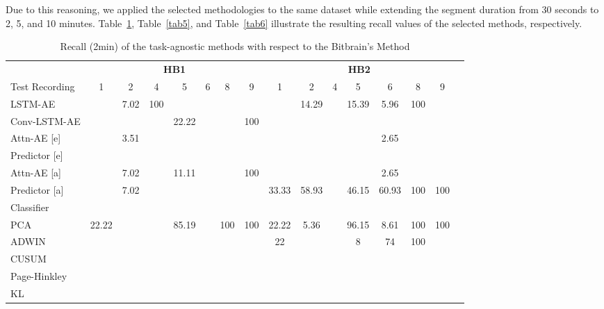 Due to this reasoning, we applied the selected methodologies to the same dataset while extending the segment duration from 30 seconds to 2, 5, and 10 minutes. Table~\ref{tab4}, Table~\ref{tab5}, and Table~\ref{tab6} illustrate the resulting recall values of the selected methods, respectively.

\begin{table}[btp]
\centering
\caption{Recall (2min) of the task-agnostic methods with respect to the Bitbrain's Method}
\label{tab4}

\begin{tabular}{lccccccccccccccc}
\toprule
          & \multicolumn{7}{c}{\textbf{HB1}} & \multicolumn{7}{c}{\textbf{HB2}} \\
\cmidrule(lr){2-8}\cmidrule(lr){9-15}
Test Recording & 1 & 2 & 4 & 5 & 6 & 8 & 9 & 1 & 2 & 4 & 5 & 6 & 8 & 9 \\
\cmidrule(lr){2-8}\cmidrule(lr){9-15}
LSTM-AE	&		&	7.02	&	100	&		&		&		&		&		&	14.29	&		&	15.39	&	5.96	&	100	&		\\
Conv-LSTM-AE	&		&		&		&	22.22	&		&		&	100	&		&		&		&		&		&		&		\\
\midrule
Attn-AE [e]	&		&	3.51	&		&		&		&		&		&		&		&		&		&	2.65	&		&		\\
Predictor [e]	&		&		&		&		&		&		&		&		&		&		&		&		&		&		\\
\midrule
Attn-AE [a]	&		&	7.02	&		&	11.11	&		&		&	100	&		&		&		&		&	2.65	&		&		\\
Predictor [a]	&		&	7.02	&		&		&		&		&		&	33.33	&	58.93	&		&	46.15	&	60.93	&	100	&	100	\\
Classifier  &&     &       &       &       &       &       &       &       &       &       &       &       &         \\
\midrule
PCA	&	22.22	&		&		&	85.19	&		&	100	&	100	&	22.22	&	5.36	&		&	96.15	&	8.61	&	100	&	100	\\
ADWIN      &   &     &       &     &       &     &       & 22 &   &       & 8  &  74 & 100  &         \\
CUSUM      &   &     &       &    &       &    &       &  &    &       &   &  &   &         \\
Page-Hinkley      &   &     &       &    &       &    &       &   &    &       &  &  &    &         \\
KL      &   &     &       &    &       &    &       &   &   &       &  &  &    &         \\
\bottomrule
\end{tabular}

\end{table}


